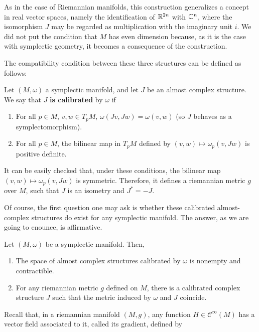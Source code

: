 As in the case of Riemannian manifolds, this construction generalizes a concept in real vector spaces, namely the identification of $\mathbb{R}^{2n}$ with $\mathbb{C}^n$, where the isomorphism $J$ may be regarded as multiplication with the imaginary unit $i$. We did not put the condition that $M$ has even dimension because, as it is the case with symplectic geometry, it becomes a consequence of the construction.

The compatibility condition between these three structures can be defined as follows:

\begin{deff}
Let $(M,\omega)$ a symplectic manifold, and let $J$ be an almost complex structure. We say that $J$ {\bf is calibrated} by $\omega$ if

\begin{enumerate}
	\item For all $p \in M$, $v,w \in T_pM$, $\omega(Jv,Jw) = \omega(v,w)$ (so $J$ behaves as a symplectomorphism).
	\item For all $p \in M$, the bilinear map in $T_pM$ defined by $(v,w) \mapsto \omega_p(v,Jw)$ is positive definite.
\end{enumerate}
\end{deff}

It can be easily checked that, under these conditions, the bilinear map $(v,w) \mapsto \omega_p(v,Jw)$ is symmetric. Therefore, it defines a riemannian metric $g$ over $M$, such that $J$ is an isometry and $J^{\ast} = - J$.

Of course, the first question one may ask is whether these calibrated almost-complex structures do exist for any symplectic manifold. The answer, as we are going to enounce, is affirmative.

\begin{prop} Let $(M,\omega)$ be a symplectic manifold. Then,

\begin{enumerate}
	\item The space of almost complex structures calibrated by $\omega$ is nonempty and contractible.
	\item For any riemannian metric $g$ defined on $M$, there is a calibrated complex structure $J$ such that the metric induced by $\omega$ and $J$ coincide.
\end{enumerate}
\end{prop}

Recall that, in a riemannian manifold $(M,g)$, any function $H \in \mathcal{C}^{\infty}(M)$ has a vector field associated to it, called its gradient, defined by


